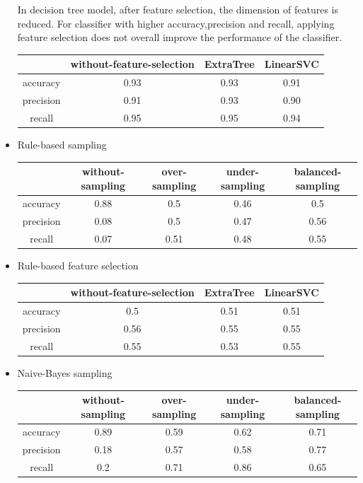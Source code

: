 \documentclass{article}
\begin{document}
\begin{itemize}
In decision tree model, after feature selection, the dimension of features is reduced. For classifier with higher accuracy,precision and recall, applying feature selection does not overall improve the performance of the classifier.

\begin{tabular}{c|c|c|c}
\hline
 &without-feature-selection &ExtraTree &LinearSVC\\
\hline
accuracy &0.93 &0.93 &0.91\\
\hline
precision &0.91 &0.93 &0.90\\
\hline
recall &0.95 &0.95 &0.94\\
\hline
\end{tabular}


\item Rule-based sampling

\begin{tabular}{c|c|c|c|c}
\hline
 &without-sampling &over-sampling &under-sampling &balanced-sampling\\
\hline
accuracy &0.88 &0.5 &0.46 &0.5\\
\hline
precision &0.08 &0.5 &0.47 &0.56\\
\hline
recall &0.07 &0.51 &0.48 &0.55\\
\hline
\end{tabular}

\item Rule-based feature selection

\begin{tabular}{c|c|c|c}
\hline
 &without-feature-selection &ExtraTree &LinearSVC\\
\hline
accuracy &0.5 &0.51 &0.51\\
\hline
precision &0.56 &0.55 &0.55\\
\hline
recall &0.55 &0.53 &0.55\\
\hline
\end{tabular}

\item Naive-Bayes sampling

\begin{tabular}{c|c|c|c|c}
\hline
 &without-sampling &over-sampling &under-sampling &balanced-sampling\\
\hline
accuracy &0.89 &0.59 &0.62 &0.71\\
\hline
precision &0.18 &0.57 &0.58 &0.77\\
\hline
recall &0.2 &0.71 &0.86 &0.65\\
\hline
\end{tabular}


\end{itemize}
\end{document}

